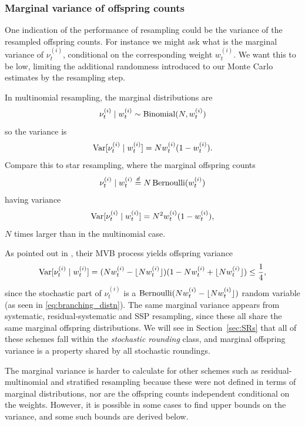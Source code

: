 \subsubsection{Marginal variance of offspring counts}
One indication of the performance of resampling could be the variance of the resampled offspring counts. For instance we might ask what is the marginal variance of $\nu_t^{(i)}$, conditional on the corresponding weight $w_t^{(i)}$. We want this to be low, limiting the additional randomness introduced to our Monte Carlo estimates by the resampling step.

In multinomial resampling, the marginal distributions are
\begin{equation*}
\nu_t^{(i)} \mid w_t^{(i)} 
\sim \operatorname{Binomial}(N, w_t^{(i)})
\end{equation*}
so the variance is
\begin{equation*}
\operatorname{Var}[ \nu_t^{(i)} \mid w_t^{(i)} ]
= N w_t^{(i)} ( 1- w_t^{(i)} ) .
\end{equation*}
Compare this to star resampling, where the marginal offspring counts
\begin{equation*}
\nu_t^{(i)} \mid w_t^{(i)} 
\overset{d}{=} N \operatorname{Bernoulli}( w_t^{(i)} )
\end{equation*}
having variance
\begin{equation*}
\operatorname{Var}[ \nu_t^{(i)} \mid w_t^{(i)} ]
= N^2 w_t^{(i)} ( 1- w_t^{(i)} ) ,
\end{equation*}
$N$ times larger than in the multinomial case.

As pointed out in \textcite[p.557]{crisan1999}, their MVB process yields offspring variance
\begin{equation*}
\operatorname{Var}[ \nu_t^{(i)} \mid w_t^{(i)} ]
= ( Nw_t^{(i)} -\lfloor N w_t^{(i)} \rfloor )(1- Nw_t^{(i)} + \lfloor N w_t^{(i)} \rfloor) 
\leq \frac{1}{4} ,
\end{equation*}
since the stochastic part of $\nu_t^{(i)}$ is a $\operatorname{Bernoulli}( Nw_t^{(i)} -\lfloor N w_t^{(i)} \rfloor )$ random variable (as seen in \eqref{eq:branching_distn}).
The same marginal variance appears from systematic, residual-systematic and SSP resampling, since these all share the same marginal offspring distributions. We will see in Section~\ref{sec:SRs} that all of these schemes fall within the \emph{stochastic rounding} class, and marginal offspring variance is a property shared by all stochastic roundings.

The marginal variance is harder to calculate for other schemes such as residual-multinomial and stratified resampling because these were not defined in terms of marginal distributions, nor are the offspring counts independent conditional on the weights.
However, it is possible in some cases to find upper bounds on the variance, and some such bounds are derived below.

